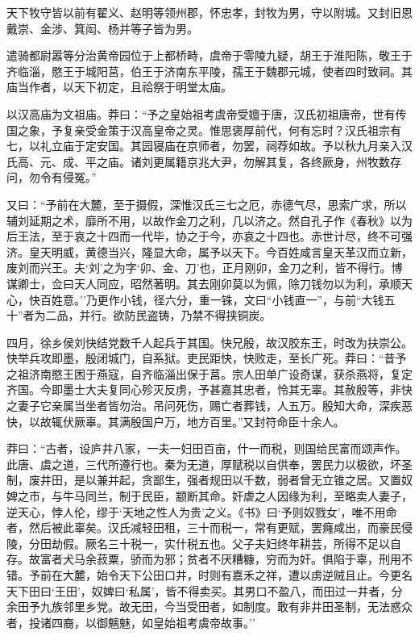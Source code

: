 \documentclass[]{article}
\begin{document}
天下牧守皆以前有翟义、赵明等领州郡，怀忠孝，封牧为男，守以附城。又封旧恩戴崇、金涉、箕闳、杨并等子皆为男。

遣骑都尉嚣等分治黄帝园位于上都桥畤，虞帝于零陵九疑，胡王于淮阳陈，敬王于齐临淄，愍王于城阳莒，伯王于济南东平陵，孺王于魏郡元城，使者四时致祠。其庙当作者，以天下初定，且祫祭于明堂太庙。

以汉高庙为文祖庙。莽曰：``予之皇始祖考虞帝受嬗于唐，汉氏初祖唐帝，世有传国之象，予复亲受金策于汉高皇帝之灵。惟思褒厚前代，何有忘时？汉氏祖宗有七，以礼立庙于定安国。其园寝庙在京师者，勿罢，祠荐如故。予以秋九月亲入汉氏高、元、成、平之庙。诸刘更属籍京兆大尹，勿解其复，各终厥身，州牧数存问，勿令有侵冤。''

又曰：``予前在大麓，至于摄假，深惟汉氏三七之厄，赤德气尽，思索广求，所以辅刘延期之术，靡所不用，以故作金刀之利，几以济之。然自孔子作《春秋》以为后王法，至于哀之十四而一代毕，协之于今，亦哀之十四也。赤世计尽，终不可强济。皇天明威，黄德当兴，隆显大命，属予以天下。今百姓咸言皇天革汉而立新，废刘而兴王。夫`刘'之为字`卯、金、刀'也，正月刚卯，金刀之利，皆不得行。博谋卿士，佥曰天人同应，昭然著明。其去刚卯莫以为佩，除刀钱勿以为利，承顺天心，快百姓意。''乃更作小钱，径六分，重一铢，文曰``小钱直一''，与前``大钱五十''者为二品，并行。欲防民盗铸，乃禁不得挟铜炭。

四月，徐乡侯刘快结党数千人起兵于其国。快兄殷，故汉胶东王，时改为扶崇公。快举兵攻即墨，殷闭城门，自系狱。吏民距快，快败走，至长广死。莽曰：``昔予之祖济南愍王困于燕寇，自齐临淄出保于莒。宗人田单广设奇谋，获杀燕将，复定齐国。今即墨士大夫复同心殄灭反虏，予甚嘉其忠者，怜其无辜。其赦殷等，非快之妻子它亲属当坐者皆勿治。吊问死伤，赐亡者葬钱，人五万。殷知大命，深疾恶快，以故辄伏厥辜。其满殷国户万，地方百里。''又封符命臣十余人。

莽曰：``古者，设庐井八家，一夫一妇田百亩，什一而税，则国给民富而颂声作。此唐、虞之道，三代所遵行也。秦为无道，厚赋税以自供奉，罢民力以极欲，坏圣制，废井田，是以兼并起，贪鄙生，强者规田以千数，弱者曾无立锥之居。又置奴婢之市，与牛马同兰，制于民臣，颛断其命。奸虐之人因缘为利，至略卖人妻子，逆天心，悖人伦，缪于`天地之性人为贵'之义。《书》曰`予则奴戮女'，唯不用命者，然后被此辜矣。汉氏减轻田租，三十而税一，常有更赋，罢癃咸出，而豪民侵陵，分田劫假。厥名三十税一，实什税五也。父子夫妇终年耕芸，所得不足以自存。故富者犬马余菽粟，骄而为邪；贫者不厌糟糠，穷而为奸。俱陷于辜，刑用不错。予前在大麓，始令天下公田口井，时则有嘉禾之祥，遭以虏逆贼且止。今更名天下田曰`王田'，奴婢曰`私属'，皆不得卖买。其男口不盈八，而田过一井者，分余田予九族邻里乡党。故无田，今当受田者，如制度。敢有非井田圣制，无法惑众者，投诸四裔，以御魑魅，如皇始祖考虞帝故事。''
\end{document}

